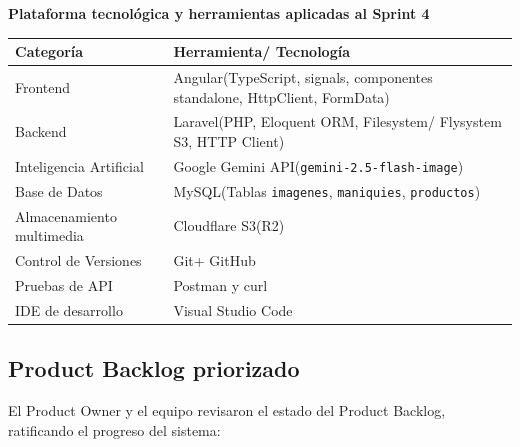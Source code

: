 \documentclass[12pt,a4paper]{article}
\begin{document}
\textbf{Plataforma tecnológica y herramientas aplicadas al Sprint 4}

\begin{center}
\small
\begin{tabularx}{\textwidth}{p{4.8cm} L}
\toprule
\textbf{Categoría} & \textbf{Herramienta/ Tecnología} \\
\midrule
Frontend & Angular(TypeScript, signals, componentes standalone, HttpClient, FormData) \\
Backend & Laravel(PHP, Eloquent ORM, Filesystem/ Flysystem S3, HTTP Client) \\
Inteligencia Artificial & Google Gemini API(\texttt{gemini-2.5-flash-image}) \\
Base de Datos & MySQL(Tablas \texttt{imagenes}, \texttt{maniquies}, \texttt{productos}) \\
Almacenamiento multimedia & Cloudflare S3(R2) \\
Control de Versiones & Git+ GitHub \\
Pruebas de API & Postman y curl \\
IDE de desarrollo & Visual Studio Code \\
\bottomrule
\end{tabularx}
\end{center}

\subsection*{Product Backlog priorizado}

El Product Owner y el equipo revisaron el estado del Product Backlog, ratificando el progreso del sistema:
\end{document}
